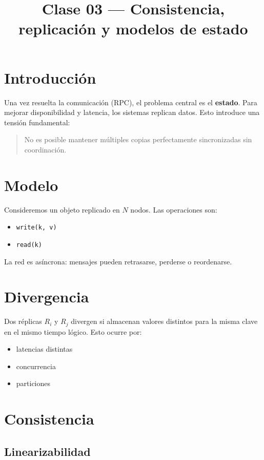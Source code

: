 \documentclass[variant=apuntes,cover=institutional,mode=screen]{ua-engineering-v6-article}
\title{Clase 03 --- Consistencia, replicación y modelos de estado}
\author{\UAProfessor}
\date{\UADate}
\begin{document}
\maketitle

\section{Introducción}

Una vez resuelta la comunicación (RPC), el problema central es el \textbf{estado}. Para mejorar disponibilidad y latencia, los sistemas replican datos. Esto introduce una tensión fundamental:

\begin{quote}
No es posible mantener múltiples copias perfectamente sincronizadas sin coordinación.
\end{quote}

\section{Modelo}

Consideremos un objeto replicado en $N$ nodos. Las operaciones son:
\begin{itemize}
\item \texttt{write(k, v)}
\item \texttt{read(k)}
\end{itemize}

La red es asíncrona: mensajes pueden retrasarse, perderse o reordenarse.

\section{Divergencia}

Dos réplicas $R_i$ y $R_j$ divergen si almacenan valores distintos para la misma clave en el mismo tiempo lógico. Esto ocurre por:
\begin{itemize}
\item latencias distintas
\item concurrencia
\item particiones
\end{itemize}

\section{Consistencia}

\subsection{Linearizabilidad}
\end{document}
